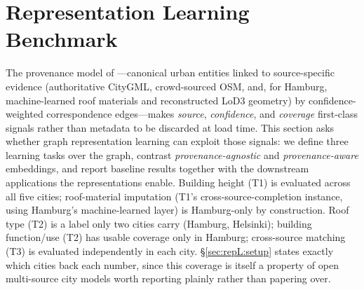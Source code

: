 
\section{Representation Learning Benchmark}
\label{sec:repL}

The provenance model of \benchname{}---canonical urban entities linked to
source-specific evidence (authoritative CityGML, crowd-sourced OSM, and, for
Hamburg, machine-learned roof materials and reconstructed LoD3 geometry) by
confidence-weighted correspondence edges---makes \emph{source}, \emph{confidence},
and \emph{coverage} first-class signals rather than metadata to be discarded at
load time. This section asks whether graph representation learning can exploit
those signals: we define three learning tasks over the graph, contrast
\emph{provenance-agnostic} and \emph{provenance-aware} embeddings, and report
baseline results together with the downstream applications the representations
enable. Building height (T1) is evaluated across all five cities;
roof-material imputation (T1's cross-source-completion instance, using
Hamburg's machine-learned layer) is Hamburg-only by construction. Roof type
(T2) is a label only two cities carry (Hamburg, Helsinki); building
function/use (T2) has usable coverage only in Hamburg; cross-source matching
(T3) is evaluated independently in each city. \S\ref{sec:repL:setup} states
exactly which cities back each number, since this coverage is itself a
property of open multi-source city models worth reporting plainly rather than
papering over.

